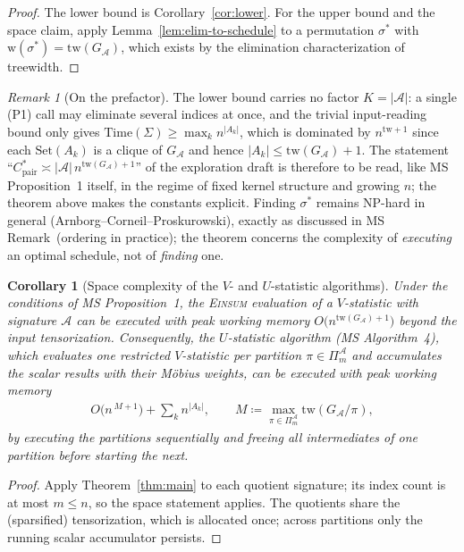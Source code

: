 \documentclass[11pt]{article}
\newcommand{\Einsum}{\textsc{Einsum}}
\newcommand{\calA}{\mathcal{A}}
\newcommand{\tw}{\mathrm{tw}}
\newcommand{\treewidthp}[1]{\tw(#1)}
\newcommand{\takesetp}[1]{\mathrm{Set}(#1)}
\newcommand{\graphform}[1]{G_{#1}}
\newcommand{\wid}{\mathrm{w}}
\newcommand{\Time}{\mathrm{Time}}
\theoremstyle{plain}
\newtheorem{corollary}{Corollary}
\theoremstyle{definition}
\theoremstyle{remark}
\newtheorem{remark}{Remark}
\begin{document}
\begin{proof}
The lower bound is Corollary~\ref{cor:lower}.  For the upper bound and
the space claim, apply Lemma~\ref{lem:elim-to-schedule} to a permutation
$\sigma^\ast$ with $\wid(\sigma^\ast) = \treewidthp{\graphform{\calA}}$, which
exists by the elimination characterization of treewidth.
\end{proof}

\begin{remark}[On the prefactor]
\label{rem:prefactor}
The lower bound carries no factor $K=|\calA|$: a single (P1) call may
eliminate several indices at once, and the trivial input-reading bound
only gives $\Time(\Sigma) \ge \max_k n^{|A_k|}$, which is dominated by
$n^{\tw+1}$ since each $\takesetp{A_k}$ is a clique of
$\graphform{\calA}$ and hence $|A_k| \le \treewidthp{\graphform{\calA}}+1$.  The
statement ``$C^\ast_{\mathrm{pair}} \asymp |\calA|\,
n^{\treewidthp{\graphform{\calA}}+1}$'' of the exploration draft is therefore to
be read, like MS Proposition~1 itself, in the regime of fixed kernel
structure and growing $n$; the theorem above makes the constants
explicit.  Finding $\sigma^\ast$ remains NP-hard in general
(Arnborg--Corneil--Proskurowski), exactly as discussed in MS
Remark~(ordering in practice); the theorem concerns the complexity of
\emph{executing} an optimal schedule, not of \emph{finding} one.
\end{remark}

\begin{corollary}[Space complexity of the $V$- and $U$-statistic
algorithms]
\label{cor:space}
Under the conditions of MS Proposition~1, the \Einsum{} evaluation of a
$V$-statistic with signature $\calA$ can be executed with peak working
memory $O\bigl(n^{\treewidthp{\graphform{\calA}}+1}\bigr)$ beyond the input
tensorization.  Consequently, the $U$-statistic algorithm (MS
Algorithm~4), which evaluates one restricted $V$-statistic per partition
$\pi \in \Pi^{\calA}_m$ and accumulates the scalar results with their
M\"obius weights, can be executed with peak working memory
\begin{align*}
   O\bigl(n^{\,M+1}\bigr) + \textstyle\sum_{k} n^{|A_k|},
   \qquad
   M \coloneqq \max_{\pi \in \Pi^{\calA}_m} \treewidthp{\graphform{\calA}/\pi},
\end{align*}
by executing the partitions sequentially and freeing all intermediates of
one partition before starting the next.
\end{corollary}

\begin{proof}
Apply Theorem~\ref{thm:main} to each quotient signature; its index count
is at most $m \le n$, so the space statement applies.  The quotients
share the (sparsified) tensorization, which is allocated once; across
partitions only the running scalar accumulator persists.
\end{proof}
\end{document}
